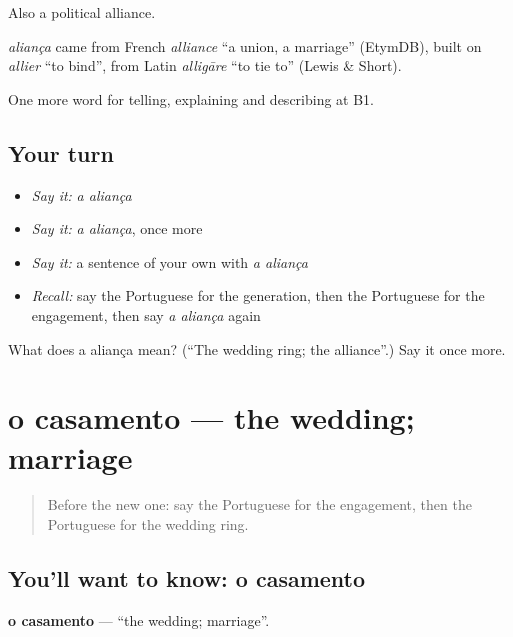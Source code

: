 Also a political alliance.

\begin{cousinweb}
\emph{aliança} came from French \emph{alliance} \textquotedblleft{}a union, a marriage\textquotedblright{} (EtymDB), built on \emph{allier} \textquotedblleft{}to bind\textquotedblright{}, from Latin \emph{alligāre} \textquotedblleft{}to tie to\textquotedblright{} (Lewis \& Short).
\end{cousinweb}

\begin{grammarlens}[title={What you've built}]
One more word for telling, explaining and describing at B1.
\end{grammarlens}

\subsection*{Your turn}
\begin{itemize}
\raggedright
  \item \emph{Say it:} \emph{a aliança}
  \item \emph{Say it:} \emph{a aliança}, once more
  \item \emph{Say it:} a sentence of your own with \emph{a aliança}
  \item \emph{Recall:} say the Portuguese for the generation, then the Portuguese for the engagement, then say \emph{a aliança} again
\end{itemize}

\begin{tcolorbox}[breakable,colback=teal!4,colframe=teal!35!black,title={Before you move on}]
What does a aliança mean? (\textquotedblleft{}The wedding ring; the alliance\textquotedblright{}.) Say it once more.
\end{tcolorbox}
\section[o casamento]{o casamento — the wedding; marriage}

\label{lesson:PT-C312-casamento}



\begin{quote}
Before the new one: say the Portuguese for the engagement, then the Portuguese for the wedding ring.
\end{quote}

\subsection*{You'll want to know: o casamento}
\textbf{o casamento} — \textquotedblleft{}the wedding; marriage\textquotedblright{}.

